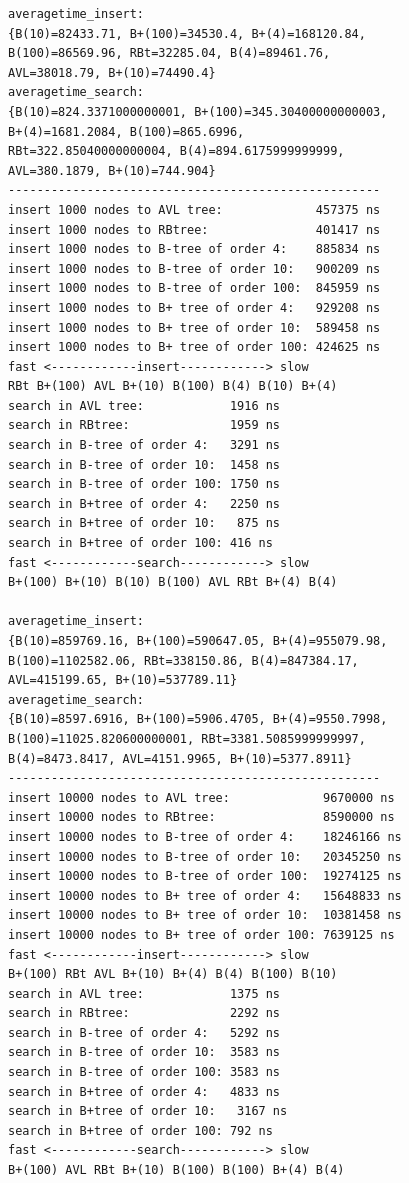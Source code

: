 \documentclass{article}
\begin{document}
\begin{verbatim}
averagetime_insert:
{B(10)=82433.71, B+(100)=34530.4, B+(4)=168120.84, 
B(100)=86569.96, RBt=32285.04, B(4)=89461.76, 
AVL=38018.79, B+(10)=74490.4}
averagetime_search:
{B(10)=824.3371000000001, B+(100)=345.30400000000003, 
B+(4)=1681.2084, B(100)=865.6996, 
RBt=322.85040000000004, B(4)=894.6175999999999, 
AVL=380.1879, B+(10)=744.904}
----------------------------------------------------
insert 1000 nodes to AVL tree:             457375 ns
insert 1000 nodes to RBtree:               401417 ns
insert 1000 nodes to B-tree of order 4:    885834 ns
insert 1000 nodes to B-tree of order 10:   900209 ns
insert 1000 nodes to B-tree of order 100:  845959 ns
insert 1000 nodes to B+ tree of order 4:   929208 ns
insert 1000 nodes to B+ tree of order 10:  589458 ns
insert 1000 nodes to B+ tree of order 100: 424625 ns
fast <------------insert------------> slow
RBt B+(100) AVL B+(10) B(100) B(4) B(10) B+(4) 
search in AVL tree:            1916 ns
search in RBtree:              1959 ns
search in B-tree of order 4:   3291 ns
search in B-tree of order 10:  1458 ns
search in B-tree of order 100: 1750 ns
search in B+tree of order 4:   2250 ns
search in B+tree of order 10:   875 ns
search in B+tree of order 100: 416 ns
fast <------------search------------> slow
B+(100) B+(10) B(10) B(100) AVL RBt B+(4) B(4) 

averagetime_insert:
{B(10)=859769.16, B+(100)=590647.05, B+(4)=955079.98, 
B(100)=1102582.06, RBt=338150.86, B(4)=847384.17, 
AVL=415199.65, B+(10)=537789.11}
averagetime_search:
{B(10)=8597.6916, B+(100)=5906.4705, B+(4)=9550.7998, 
B(100)=11025.820600000001, RBt=3381.5085999999997, 
B(4)=8473.8417, AVL=4151.9965, B+(10)=5377.8911}
----------------------------------------------------
insert 10000 nodes to AVL tree:             9670000 ns
insert 10000 nodes to RBtree:               8590000 ns
insert 10000 nodes to B-tree of order 4:    18246166 ns
insert 10000 nodes to B-tree of order 10:   20345250 ns
insert 10000 nodes to B-tree of order 100:  19274125 ns
insert 10000 nodes to B+ tree of order 4:   15648833 ns
insert 10000 nodes to B+ tree of order 10:  10381458 ns
insert 10000 nodes to B+ tree of order 100: 7639125 ns
fast <------------insert------------> slow
B+(100) RBt AVL B+(10) B+(4) B(4) B(100) B(10) 
search in AVL tree:            1375 ns
search in RBtree:              2292 ns
search in B-tree of order 4:   5292 ns
search in B-tree of order 10:  3583 ns
search in B-tree of order 100: 3583 ns
search in B+tree of order 4:   4833 ns
search in B+tree of order 10:   3167 ns
search in B+tree of order 100: 792 ns
fast <------------search------------> slow
B+(100) AVL RBt B+(10) B(100) B(100) B+(4) B(4) 


\end{verbatim}
\end{document}
